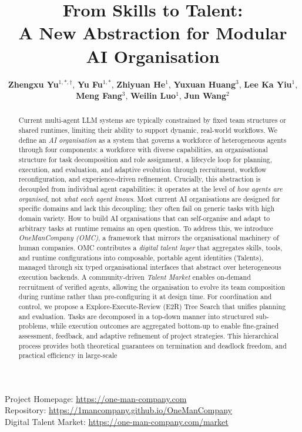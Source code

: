 \documentclass[11pt,a4paper]{article}
\title{\bfseries\color{titleRed}
From Skills to Talent: \\[2pt]
A New Abstraction for Modular AI Organisation}
\author{
\textbf{Zhengxu Yu}$^{1,*,\dagger}$,
\textbf{Yu Fu}$^{1,*}$,
\textbf{Zhiyuan He}$^{1}$,
\textbf{Yuxuan Huang}$^{3}$,
\textbf{Lee Ka Yiu}$^{1}$,\\
\textbf{Meng Fang}$^{3}$,
\textbf{Weilin Luo}$^{1}$,
\textbf{Jun Wang}$^{2}$
}
\date{}
\begin{document}
\vspace{-3.2cm}
\maketitle
\thispagestyle{empty}
\vspace{-1.6em}

\begin{center}
Project Homepage: \url{https://one-man-company.com} \\
Repository: \url{https://1mancompany.github.io/OneManCompany}\\
Digital Talent Market: \url{https://one-man-company.com/market}
\end{center}

\begin{abstract}
Current multi-agent LLM systems are typically constrained by fixed team structures or shared runtimes, limiting their ability to support dynamic, real-world workflows.  We define an \emph{AI organisation} as a system that governs a workforce of heterogeneous agents through four components: a workforce with diverse capabilities, an organisational structure for task decomposition and role assignment, a lifecycle loop for planning, execution, and evaluation, and adaptive evolution through recruitment, workflow reconfiguration, and experience-driven refinement.  Crucially, this abstraction is decoupled from individual agent capabilities: it operates at the level of \emph{how agents are organised}, not \emph{what each agent knows}.  Most current AI organisations are designed for specific domains and lack this decoupling; they often fail on generic tasks with high domain variety.  How to build AI organisations that can self-organise and adapt to arbitrary tasks at runtime remains an open question.  To address this, we introduce \emph{OneManCompany (OMC)}, a framework that mirrors the organisational machinery of human companies.  OMC contributes a \emph{digital talent layer} that aggregates skills, tools, and runtime configurations into composable, portable agent identities (Talents), managed through six typed organisational interfaces that abstract over heterogeneous execution backends.  A community-driven \emph{Talent Market} enables on-demand recruitment of verified agents, allowing the organisation to evolve its team composition during runtime rather than pre-configuring it at design time.
For coordination and control, we propose a Explore-Execute-Review (E2R) Tree Search that unifies planning and evaluation. Tasks are decomposed in a top-down manner into structured sub-problems, while execution outcomes are aggregated bottom-up to enable fine-grained assessment, feedback, and adaptive refinement of project strategies. This hierarchical process provides both theoretical guarantees on termination and deadlock freedom, and practical efficiency in large-scale

\end{abstract}
\end{document}
